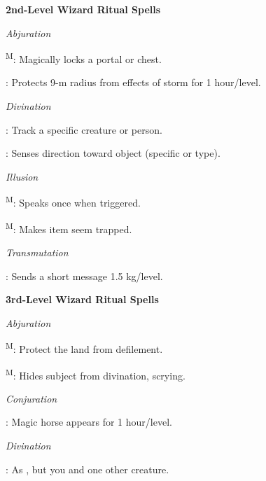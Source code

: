\noindent\textbf{2nd-Level Wizard Ritual Spells}

\noindent\textit{Abjuration}
\begin{itemize*}
	\item[] \textsuperscript{M}: Magically locks a portal or chest.
	\item[] : Protects 9-m radius from effects of storm for 1 hour/level.%
\end{itemize*}

\noindent\textit{Divination}
\begin{itemize*}
	\item[] : Track a specific creature or person. %
	\item[] : Senses direction toward object (specific or type).
\end{itemize*}

\noindent\textit{Illusion}
\begin{itemize*}
	\item[] \textsuperscript{M}: Speaks once when triggered.
	\item[] \textsuperscript{M}: Makes item seem trapped.
\end{itemize*}

\noindent\textit{Transmutation}
\begin{itemize*}
	\item[] : Sends a short message 1.5 kg/level.
\end{itemize*}

\noindent\textbf{3rd-Level Wizard Ritual Spells}

\noindent\textit{Abjuration}
\begin{itemize*}
	\item[] \textsuperscript{M}: Protect the land from defilement. %
	\item[] \textsuperscript{M}: Hides subject from divination, scrying.
\end{itemize*}

\noindent\textit{Conjuration}
\begin{itemize*}
	\item[] : Magic horse appears for 1 hour/level.
\end{itemize*}

\noindent\textit{Divination}
\begin{itemize*}
	\item[] : As , but you and one other creature.
\end{itemize*}

